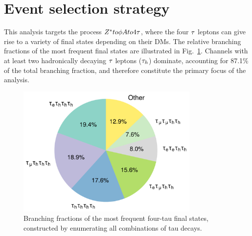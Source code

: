 \section{Event selection strategy}
\label{sec:ObjectAndEventSelections}

This analysis targets the process $Z^* to \phi A to 4\tau$, where the four $\tau$ leptons can give rise to a variety of final states depending on their \acp{DM}. The relative branching fractions of the most frequent final states are illustrated in Fig.~\ref{Figure:Chapter6_4tau_decayModes_BF}. Channels with at least two hadronically decaying $\tau$ leptons ($\tau_h$) dominate, accounting for 87.1\% of the total branching fraction, and therefore constitute the primary focus of the analysis.

\begin{figure}[!htbp]
  \centering
  \includegraphics[width=0.8\textwidth]{Figures/Chapter6/pie_BF.pdf}
    \caption[Branching fractions of the dominant four-tau decay modes.]
    {Branching fractions of the most frequent four-tau final states, constructed by enumerating all combinations of tau decays.}
  \label{Figure:Chapter6_4tau_decayModes_BF}
\end{figure}


